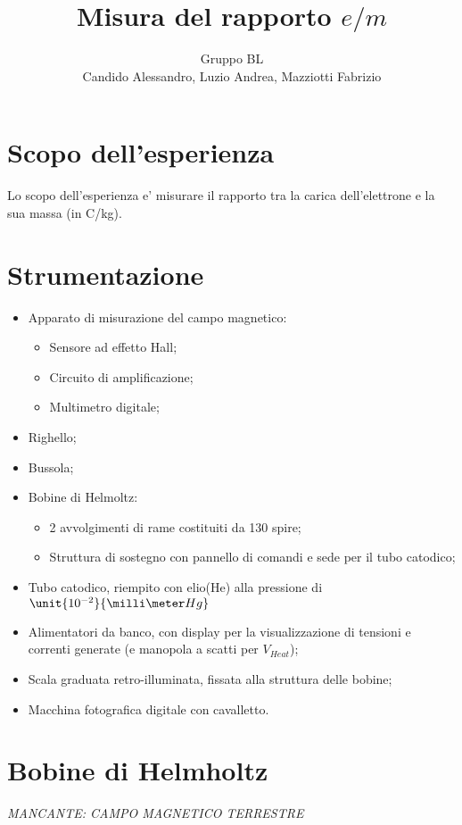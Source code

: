 \documentclass[10pt,a4paper]{article}
\title{Misura del rapporto $e/m$}
\author{Gruppo BL \\ Candido Alessandro, Luzio Andrea, Mazziotti Fabrizio}
\begin{document}
\maketitle

\section{Scopo dell'esperienza}
Lo scopo dell’esperienza e’ misurare il rapporto tra la carica dell’elettrone e la sua massa (in C/kg).

\section{Strumentazione}
\begin{itemize}
	\item Apparato di misurazione del campo magnetico:
		\begin{itemize}
			\item Sensore ad effetto Hall;
			\item Circuito di amplificazione;
			\item Multimetro digitale;
		\end{itemize}
	\item Righello;
	\item Bussola;
	\item Bobine di Helmoltz:
		\begin{itemize}
			\item 2 avvolgimenti di rame costituiti da 130 spire;
			\item Struttura di sostegno con pannello di comandi e sede per il tubo catodico;
		\end{itemize}
	\item Tubo catodico, riempito con elio(He) alla pressione di $\unit{10^{-2}}{\milli\meter Hg}$
	\item Alimentatori da banco, con display per la visualizzazione di tensioni e correnti generate (e manopola a scatti per $V_{Heat}$);
	\item Scala graduata retro-illuminata, fissata alla struttura delle bobine;
	\item Macchina fotografica digitale con cavalletto.
\end{itemize}

\section{Bobine di Helmholtz}
\emph{MANCANTE: CAMPO MAGNETICO TERRESTRE}
\end{document}
